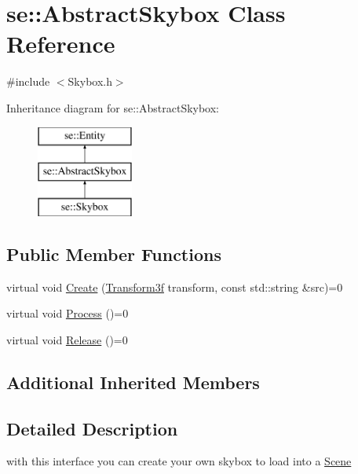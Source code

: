 \hypertarget{classse_1_1_abstract_skybox}{}\section{se\+:\+:Abstract\+Skybox Class Reference}
\label{classse_1_1_abstract_skybox}


{\ttfamily \#include $<$Skybox.\+h$>$}

Inheritance diagram for se\+:\+:Abstract\+Skybox\+:\begin{figure}[H]
\begin{center}
\leavevmode
\includegraphics[height=3.000000cm]{classse_1_1_abstract_skybox}
\end{center}
\end{figure}
\subsection*{Public Member Functions}
\begin{DoxyCompactItemize}
\item 
virtual void \mbox{\hyperlink{classse_1_1_abstract_skybox_ad9c98023e2ae2cfbb6c84929a1b9f46b}{Create}} (\mbox{\hyperlink{classse_1_1_transform3f}{Transform3f}} transform, const std\+::string \&src)=0
\item 
virtual void \mbox{\hyperlink{classse_1_1_abstract_skybox_a652add712c92f3d7ebe7f82dc353fa1c}{Process}} ()=0
\item 
virtual void \mbox{\hyperlink{classse_1_1_abstract_skybox_a5aa158b7db1140ffc5c696347f32e2ef}{Release}} ()=0
\end{DoxyCompactItemize}
\subsection*{Additional Inherited Members}


\subsection{Detailed Description}
with this interface you can create your own skybox to load into a \mbox{\hyperlink{classse_1_1_scene}{Scene}} 

